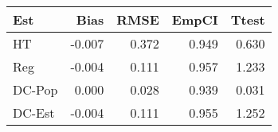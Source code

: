 
\begin{tabular}{lrrrr}
\toprule
Est & Bias & RMSE & EmpCI & Ttest\\
\midrule
HT & -0.007 & 0.372 & 0.949 & 0.630\\
Reg & -0.004 & 0.111 & 0.957 & 1.233\\
DC-Pop & 0.000 & 0.028 & 0.939 & 0.031\\
DC-Est & -0.004 & 0.111 & 0.955 & 1.252\\
\bottomrule
\end{tabular}